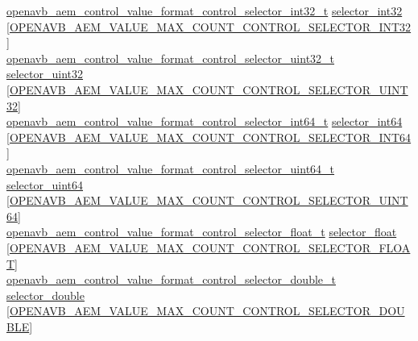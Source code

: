 \begin{DoxyCompactItemize}
\begin{tabbing}
\>\hyperlink{structopenavb__aem__control__value__format__control__selector__int32__t}{openavb\_aem\_control\_value\_format\_control\_selector\_int32\_t} \hyperlink{structopenavb__aem__descriptor__control__t_a4c13e58761fc4e7e29a61bb37071cf0b}{selector\_int32} \mbox{[}\hyperlink{openavb__aem__types__pub_8h_ae0035035fb3b8d78f6b7d3c40873d73f}{OPENAVB\_AEM\_VALUE\_MAX\_COUNT\_CONTROL\_SELECTOR\_INT32}\mbox{]}\\
\>\hyperlink{structopenavb__aem__control__value__format__control__selector__uint32__t}{openavb\_aem\_control\_value\_format\_control\_selector\_uint32\_t} \hyperlink{structopenavb__aem__descriptor__control__t_a3034709f4f9c88340cfa4762aa690fb3}{selector\_uint32} \mbox{[}\hyperlink{openavb__aem__types__pub_8h_a3c742df759b44a705c53ad629813d672}{OPENAVB\_AEM\_VALUE\_MAX\_COUNT\_CONTROL\_SELECTOR\_UINT32}\mbox{]}\\
\>\hyperlink{structopenavb__aem__control__value__format__control__selector__int64__t}{openavb\_aem\_control\_value\_format\_control\_selector\_int64\_t} \hyperlink{structopenavb__aem__descriptor__control__t_a2302bd296a615f1548f46557a652d90c}{selector\_int64} \mbox{[}\hyperlink{openavb__aem__types__pub_8h_ac7bc1a2e6391b9ba2160703d1212ea4a}{OPENAVB\_AEM\_VALUE\_MAX\_COUNT\_CONTROL\_SELECTOR\_INT64}\mbox{]}\\
\>\hyperlink{structopenavb__aem__control__value__format__control__selector__uint64__t}{openavb\_aem\_control\_value\_format\_control\_selector\_uint64\_t} \hyperlink{structopenavb__aem__descriptor__control__t_a1e791ada289351f9edafd8f8b4c5a204}{selector\_uint64} \mbox{[}\hyperlink{openavb__aem__types__pub_8h_a834197e68d56ae507b6e0ddf69b297fa}{OPENAVB\_AEM\_VALUE\_MAX\_COUNT\_CONTROL\_SELECTOR\_UINT64}\mbox{]}\\
\>\hyperlink{structopenavb__aem__control__value__format__control__selector__float__t}{openavb\_aem\_control\_value\_format\_control\_selector\_float\_t} \hyperlink{structopenavb__aem__descriptor__control__t_a835cfd7efea0bff475d8704920d622ac}{selector\_float} \mbox{[}\hyperlink{openavb__aem__types__pub_8h_aa9de2bda6b4a0d0113d5fdcc6812ea0e}{OPENAVB\_AEM\_VALUE\_MAX\_COUNT\_CONTROL\_SELECTOR\_FLOAT}\mbox{]}\\
\>\hyperlink{structopenavb__aem__control__value__format__control__selector__double__t}{openavb\_aem\_control\_value\_format\_control\_selector\_double\_t} \hyperlink{structopenavb__aem__descriptor__control__t_af16069dd62ad5febeca73b20b3effe13}{selector\_double} \mbox{[}\hyperlink{openavb__aem__types__pub_8h_abfe8bfaf217df4a6af2e4d194a23d1d8}{OPENAVB\_AEM\_VALUE\_MAX\_COUNT\_CONTROL\_SELECTOR\_DOUBLE}\mbox{]}\\

\end{tabbing}
\end{DoxyCompactItemize}
